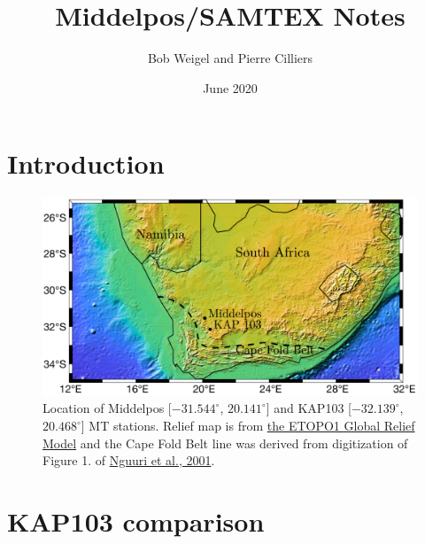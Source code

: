 \documentclass{article}
\title{Middelpos/SAMTEX Notes}
\author{Bob Weigel and Pierre Cilliers}
\date{June 2020}
\begin{document}

\section{Introduction}



\begin{figure}[h!]
\centering
\includegraphics[width=\textwidth]{figures/map.pdf}
\caption{Location of Middelpos [$-31.544^\circ$, $20.141^\circ$] and KAP103 [$-32.139^\circ$, $20.468^\circ$] MT stations. Relief map is from \href{ngdc.noaa.gov/mgg/global/global.html}{the ETOPO1 Global Relief Model} and the Cape Fold Belt line was derived from digitization of Figure 1. of \href{https://agupubs.onlinelibrary.wiley.com/doi/pdf/10.1029/2000GL012587}{Nguuri et al., 2001}.}
\label{fig:map}
\end{figure}

\clearpage

\section{KAP103 comparison}
\end{document}
